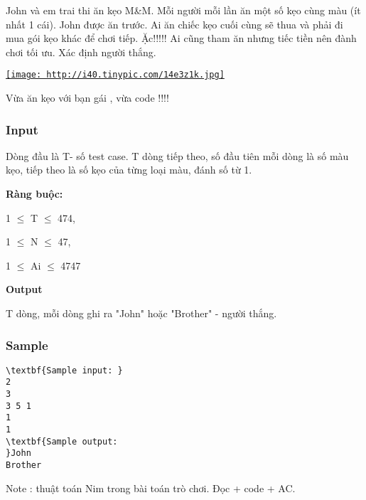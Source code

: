 

John và em trai thi ăn kẹo M\&M. Mỗi người mỗi lần ăn một số kẹo cùng màu (ít nhất 1 cái). John được ăn trước. Ai ăn chiếc kẹo cuối cùng sẽ thua và phải đi mua gói kẹo khác để chơi tiếp. Ặc!!!!! Ai cũng tham ăn nhưng tiếc tiền nên đành chơi tối ưu. Xác định người thắng.

\href{http://tinypic.com}{
\texttt{[image: http://i40.tinypic.com/14e3z1k.jpg]}}


Vừa ăn kẹo với bạn gái , vừa code !!!!

\subsubsection{Input}

Dòng đầu là T- số test case. T dòng tiếp theo, số đầu tiên mỗi dòng là số màu kẹo, tiếp theo là số kẹo của từng loại màu, đánh số từ 1.

\textbf{Ràng buộc:}


1  $\le$  T  $\le$  474,


1  $\le$  N  $\le$  47,


1  $\le$  Ai  $\le$  4747

\textbf{Output}

T dòng, mỗi dòng ghi ra "John" hoặc "Brother" - người thắng.

\subsubsection{Sample}
\begin{verbatim}
\textbf{Sample input: }
2 
3 
3 5 1 
1 
1 
\textbf{Sample output: 
}John 
Brother \end{verbatim}

Note : thuật toán Nim trong bài toán trò chơi. Đọc + code + AC.
